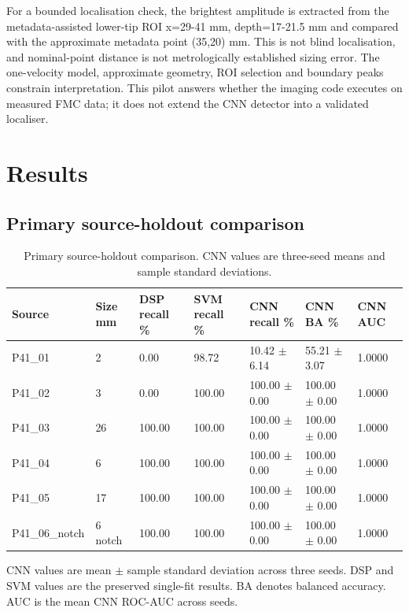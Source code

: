 \documentclass[11pt,a4paper]{article}
\begin{document}
For a bounded localisation check, the brightest amplitude is extracted from the metadata-assisted lower-tip ROI x=29-41 mm, depth=17-21.5 mm and compared with the approximate metadata point (35,20) mm. This is not blind localisation, and nominal-point distance is not metrologically established sizing error. The one-velocity model, approximate geometry, ROI selection and boundary peaks constrain interpretation. This pilot answers whether the imaging code executes on measured FMC data; it does not extend the CNN detector into a validated localiser.

\FloatBarrier
\section{Results}

\subsection{Primary source-holdout comparison}

\begin{table}[H]
\centering
\caption{Primary source-holdout comparison. CNN values are three-seed means and sample standard deviations.}
\label{tab:3}
\footnotesize
\setlength{\tabcolsep}{4pt}
\begin{tabularx}{\linewidth}{@{}YYYYYYY@{}}
\toprule
{}
\textbf{Source} & \textbf{Size mm} & \textbf{DSP recall \%} & \textbf{SVM recall \%} & \textbf{CNN recall \%} & \textbf{CNN BA \%} & \textbf{CNN AUC} \\
\midrule
P41\_01 & 2 & 0.00 & 98.72 & 10.42 \(\pm\) 6.14 & 55.21 \(\pm\) 3.07 & 1.0000 \\
P41\_02 & 3 & 0.00 & 100.00 & 100.00 \(\pm\) 0.00 & 100.00 \(\pm\) 0.00 & 1.0000 \\
P41\_03 & 26 & 100.00 & 100.00 & 100.00 \(\pm\) 0.00 & 100.00 \(\pm\) 0.00 & 1.0000 \\
P41\_04 & 6 & 100.00 & 100.00 & 100.00 \(\pm\) 0.00 & 100.00 \(\pm\) 0.00 & 1.0000 \\
P41\_05 & 17 & 100.00 & 100.00 & 100.00 \(\pm\) 0.00 & 100.00 \(\pm\) 0.00 & 1.0000 \\
P41\_06\_notch & 6 notch & 100.00 & 100.00 & 100.00 \(\pm\) 0.00 & 100.00 \(\pm\) 0.00 & 1.0000 \\
\bottomrule
\end{tabularx}
\end{table}

CNN values are mean \(\pm\) sample standard deviation across three seeds. DSP and SVM values are the preserved single-fit results. BA denotes balanced accuracy. AUC is the mean CNN ROC-AUC across seeds.
\end{document}
